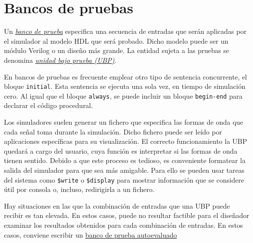 \section{Bancos de pruebas}
Un \hyperlink{test_bench}{\emph{banco de prueba}} especifica una secuencia de entradas que serán aplicadas por el simulador al modelo HDL que será probado. Dicho modelo puede ser un módulo Verilog o un diseño más grande. La entidad sujeta a las pruebas se denomina \hyperlink{unit_under_test}{\emph{unidad bajo prueba (UBP)}}.

En bancos de pruebas es frecuente emplear otro tipo de sentencia concurrente, el bloque \verb|initial|. Esta sentencia se ejecuta una sola vez, en tiempo de simulación cero. Al igual que el bloque \verb|always|, se puede incluir un bloque \verb|begin-end| para declarar el código procedural.


Los simuladores suelen generar un fichero que especifica las formas de onda que cada señal toma durante la simulación. Dicho fichero puede ser leído por aplicaciones específicas para su visualización. El correcto funcionamiento la UBP quedará a cargo del usuario, cuya función es interpretar si las formas de onda tienen sentido. Debido a que este proceso es tedioso, es conveniente formatear la salida del simulador para que sea más amigable. Para ello se pueden usar tareas del sistema como \verb|$write| o \verb|$display| para mostrar información que se considere útil por consola o, incluso, redirigirla a un fichero.

Hay situaciones en las que la combinación de entradas que una UBP puede recibir es tan elevada. En estos casos, puede no resultar factible para el diseñador examinar los resultados obtenidos para cada combinación de entradas. En estos casos, conviene escribir un \hyperlink{self-checking_test_beng}{banco de prueba autoevaluado}